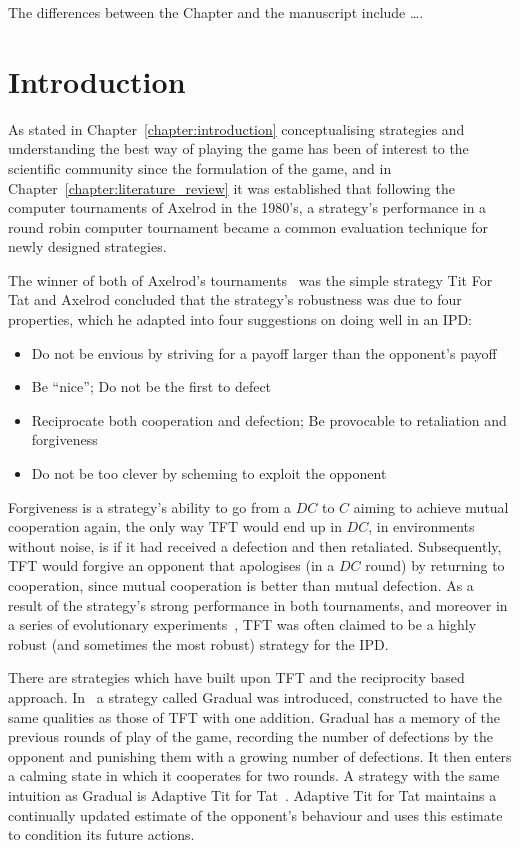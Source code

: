 \hrulefill

The differences between the Chapter and the manuscript include \dots.

\section{Introduction}

As stated in Chapter~\ref{chapter:introduction} conceptualising strategies and
understanding the best way of playing the game has been of interest to the
scientific community since the formulation of the game, and in
Chapter~\ref{chapter:literature_review} it was established that following the
computer tournaments of Axelrod in the 1980's, a strategy's performance in a
round robin computer tournament became a common evaluation technique for newly
designed strategies.

The winner of both of Axelrod's tournaments~\cite{Axelrod1980a, Axelrod1980b}
was the simple strategy Tit For Tat and Axelrod concluded that the strategy's
robustness was due to four properties, which he adapted into four suggestions on
doing well in an IPD:

\begin{itemize}
    \item Do not be envious by striving for a payoff larger than the opponent's payoff
    \item Be ``nice''; Do not be the first to defect
    \item Reciprocate both cooperation and defection; Be provocable to retaliation and forgiveness
    \item Do not be too clever by scheming to exploit the opponent
\end{itemize}

Forgiveness is a strategy's ability to go from a \(DC\) to \(C\) aiming to achieve
mutual cooperation again, the only way TFT would end up in \(DC\), in
environments without noise, is if it had received a defection and then retaliated.
Subsequently, TFT would forgive an opponent that apologises (in a \(DC\) round)
by returning to cooperation, since mutual cooperation is better than mutual defection.
As a result of the strategy's strong performance in both tournaments, and moreover in a
series of evolutionary experiments~\cite{Axelrod1981}, TFT was often
claimed to be a highly robust (and sometimes the most robust) strategy for the IPD.

There are strategies which have built upon TFT and the reciprocity based approach.
In~\cite{Beaufils1997} a strategy called Gradual was introduced, constructed to have the
same qualities as those of TFT with one addition. Gradual has a memory
of the previous rounds of play of the game, recording the number of defections
by the opponent and punishing them with a growing number of defections. It
then enters a calming state in which it cooperates for two rounds. A
strategy with the same intuition as Gradual is Adaptive Tit for
Tat~\cite{tzafestas-2000a}. Adaptive Tit for Tat maintains a continually updated estimate of the
opponent's behaviour and uses this estimate to condition its future actions.

